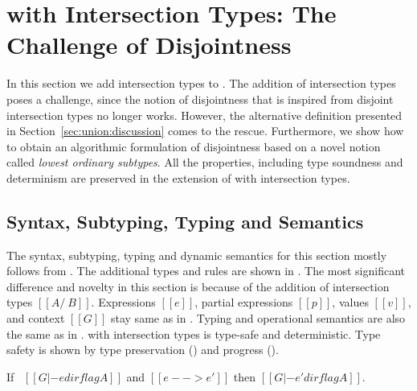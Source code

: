 \section{\cal with Intersection Types: The Challenge of Disjointness}
\label{sec:inter}

In this section we add intersection types to \cal.
The addition of intersection types poses a challenge,
since the notion of disjointness that is inspired from disjoint intersection
types no longer works. However, the alternative definition presented in
Section~\ref{sec:union:discussion} comes to the rescue. Furthermore, we show how to obtain
an algorithmic formulation of disjointness based on a novel notion
called \emph{lowest ordinary subtypes}. All the properties, including
type soundness and determinism are preserved in the extension of \cal
with intersection types.

\subsection{Syntax, Subtyping, Typing and Semantics}
\label{sec:inter:system}
The syntax, subtyping, typing and dynamic semantics for this section mostly follows
from .  The additional types and rules are shown in
.
The most significant difference and novelty in this section
is because of the addition of intersection types $[[A
    /\ B]]$. Expressions $[[e]]$, partial expressions $[[p]]$, values
$[[v]]$, and context $[[G]]$ stay same as in . Typing
and operational semantics are also the same as in .
\cal with intersection types is type-safe and deterministic.
Type safety is shown by type preservation () and
progress (). 

\begin{lemma}
\label{lemma:inter:preservation}
  If \ $[[G |- e dirflag A]]$ and $[[e --> e']]$ then $[[G |- e' dirflag A]]$.
\end{lemma}

